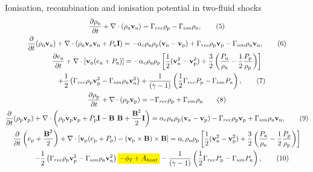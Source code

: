 \documentclass[10pt,aspectratio=169,usenames,dvipsnames]{beamer}
\newcommand{\mathcolorbox}[2]{\colorbox{#1}{$\displaystyle #2$}}
\begin{document}
\begin{frame}{Ionisation, recombination and ionisation potential in two-fluid shocks}
\footnotesize
\begin{gather}
\frac{\partial \rho _{\text{n}}}{\partial t} + \nabla \cdot (\rho _{\text{n}} \textbf{v}_{\text{n}})= \Gamma _{rec} \rho _{\rm p} - \Gamma _{ion} \rho _{\rm n}, \label{eqn:neutral1}\tag{5} \\
\frac{\partial}{\partial t}(\rho _{\text{n}} \textbf{v}_{\text{n}}) + \nabla \cdot (\rho _{\text{n}} \textbf{v}_{\text{n}} \textbf{v}_{\text{n}} + P_{\text{n}} \textbf{I}) = -\alpha _c \rho_{\text{n}} \rho_{\text{p}} (\textbf{v}_{\text{n}}-\textbf{v}_{\text{p}}) + \Gamma _{rec} \rho _{\rm p} \textbf{v}_{\rm p} - \Gamma _{ion} \rho_{\rm n} \textbf{v}_{\rm n},\tag{6} \\
\frac{\partial e_{\text{n}}}{\partial t} + \nabla \cdot \left[\textbf{v}_{\text{n}} (e_{\text{n}} +P_{\text{n}}) \right] = -\alpha _c \rho _{\text{n}} \rho _{\text{p}} \left[ \frac{1}{2} (\textbf{v}_{\text{n}} ^2 - \textbf{v}_{\text{p}} ^2)+ \frac{3}{2} \left(\frac{P_{\rm n}}{\rho_{\rm n}}-\frac{1}{2}\frac{P_{\rm p}}{\rho_{\rm p}}\right) \right] \nonumber \\ \hspace{0.5cm}+ \frac{1}{2} \left( \Gamma _{rec} \rho _{\rm p} \textbf{v}_{\rm p} ^2 - \Gamma _{ion} \rho _{\rm n} \textbf{v}_{\rm n} ^2 \right) +\frac{1}{ (\gamma-1)} \left( \frac{1}{2} \Gamma _{rec} P_{\rm p} -\Gamma _{ion} P_{\rm n} \right), \tag{7}\\
\frac{\partial \rho _{\text{p}}}{\partial t} + \nabla \cdot (\rho_{\text{p}} \textbf{v}_{\text{p}}) = - \Gamma _{rec} \rho _{\rm p} + \Gamma _{ion} \rho _{\rm n} \label{eqn:plasma1}\tag{8}\\
\frac{\partial}{\partial t} (\rho_{\text{p}} \textbf{v}_{\text{p}})+ \nabla \cdot \left( \rho_{\text{p}} \textbf{v}_{\text{p}} \textbf{v}_{\text{p}} + P_{\text{p}} \textbf{I} - \textbf{B B} + \frac{\textbf{B}^2}{2} \textbf{I} \right) = \alpha _c \rho_{\text{n}} \rho_{\text{p}}(\textbf{v}_{\text{n}} - \textbf{v}_{\text{p}}) - \Gamma _{rec} \rho _{\rm p} \textbf{v}_{\rm p} + \Gamma _{ion} \rho_{\rm n} \textbf{v}_{\rm n},\tag{9}\\
\frac{\partial}{\partial t} \left( e_{\text{p}} + \frac{\textbf{B}^2}{2} \right) + \nabla \cdot \left[ \textbf{v}_{\text{p}} ( e_{\text{p}} + P_{\text{p}}) -  (\textbf{v}_{\rm p} \times \textbf{B}) \times \textbf{B} \right]  =  \alpha _c \rho _{\text{n}} \rho _{\text{p}} \left[ \frac{1}{2} (\textbf{v}_{\text{n}} ^2 - \textbf{v}_{\text{p}} ^2)+ \frac{3}{2} \left(\frac{P_{\rm n}}{\rho_{\rm n}}-\frac{1}{2}\frac{P_{\rm p}}{\rho_{\rm p}}\right) \right] \nonumber \\ \hspace{0.5cm}- \frac{1}{2} \left( \Gamma _{rec} \rho _{\rm p} \textbf{v}_{\rm p} ^2 - \Gamma _{ion} \rho _{\rm n} \textbf{v}_{\rm n} ^2 \right) \mathcolorbox{yellow}{- \phi_I + A_{heat}} -\frac{1}{ (\gamma-1)} \left( \frac{1}{2} \Gamma _{rec} P_{\rm p} -\Gamma _{ion} P_{\rm n} \right), \label{eqn:ep} \tag{10}\\

\end{gather}
\end{frame}
\end{document}
